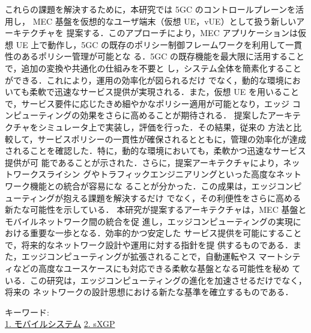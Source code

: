 \begin{spacing}{1.2}
これらの課題を解決するために，本研究では 5GC のコントロールプレーンを活用し，
MEC 基盤を仮想的なユーザ端末（仮想 UE，vUE）として扱う新しいアーキテクチャを
提案する．このアプローチにより，MEC アプリケーションは仮想 UE 上で動作し，5GC
の既存のポリシー制御フレームワークを利用して一貫性のあるポリシー管理が可能とな
る．5GC の既存機能を最大限に活用することで，追加の変換や共通化の仕組みを不要と
し，システム全体を簡素化することができる．これにより，運用の効率化が図られるだけ
でなく，動的な環境においても柔軟で迅速なサービス提供が実現される．また，仮想 UE
を用いることで，サービス要件に応じたきめ細やかなポリシー適用が可能となり，エッジ
コンピューティングの効果をさらに高めることが期待される．
提案したアーキテクチャをシミュレータ上で実装し，評価を行った．その結果，従来の
方法と比較して，サービスポリシーの一貫性が確保されるとともに，管理の効率化が達成
されることを確認した．特に，動的な環境においても，柔軟かつ迅速なサービス提供が可
能であることが示された．さらに，提案アーキテクチャにより，ネットワークスライシン
グやトラフィックエンジニアリングといった高度なネットワーク機能との統合が容易にな
ることが分かった．この成果は，エッジコンピューティングが抱える課題を解決するだけ
でなく，その利便性をさらに高める新たな可能性を示している．
本研究が提案するアーキテクチャは，MEC 基盤とモバイルネットワーク間の統合を促
進し，エッジコンピューティングの実現における重要な一歩となる．効率的かつ安定した
サービス提供を可能にすることで，将来的なネットワーク設計や運用に対する指針を提
供するものである．また，エッジコンピューティングが拡張されることで，自動運転やス
マートシティなどの高度なユースケースにも対応できる柔軟な基盤となる可能性を秘め
ている．この研究は，エッジコンピューティングの進化を加速させるだけでなく，将来の
ネットワークの設計思想における新たな基準を確立するものである．
~ \\

\end{spacing}

キーワード:\\
\underline{1. モバイルシステム} 
\underline{2. sXGP}
\begin{flushright}
\dept \\
\author
\end{flushright}

